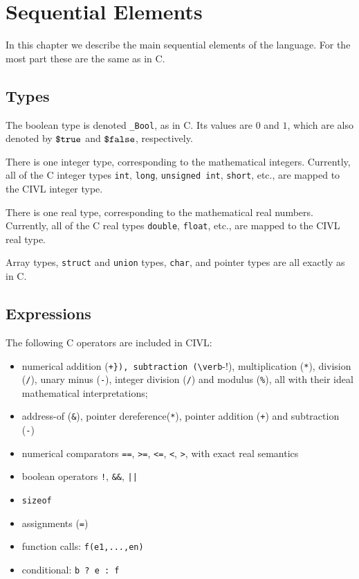
\chapter{Sequential Elements}

In this chapter we describe the main sequential elements of the
language.  For the most part these are the same as in C.

\section{Types}

The boolean type is denoted \verb!_Bool!, as in C. Its values are $0$
and $1$, which are also denoted by $\mbox{\texttt{\${}true}}$ and $\mbox{\texttt{\${}false}}$,
respectively.

There is one integer type, corresponding to the mathematical integers.
Currently, all of the C integer types \texttt{int}, \texttt{long},
\texttt{unsigned\ int}, \texttt{short}, etc., are mapped to the CIVL
integer type.

There is one real type, corresponding to the mathematical real
numbers. Currently, all of the C real types \texttt{double},
\texttt{float}, etc., are mapped to the CIVL real type.

Array types, \texttt{struct} and \texttt{union} types, \texttt{char},
and pointer types are all exactly as in C.


\section{Expressions}

The following C operators are included in CIVL: 
\begin{itemize}
\item numerical addition (\verb!+}), subtraction (\verb!-!), multiplication
  (\verb!*!), division (\verb!/!), unary minus (\verb!-!),
  integer division (\verb!/!) and modulus (\verb!%!), all with
  their ideal mathematical interpretations;
\item address-of (\verb!&!), pointer dereference(\verb!*!),
  pointer addition (\verb!+!) and subtraction (\verb!-!)
\item numerical comparators \verb!==!, \verb!>=!, \verb!<=!, \verb!<!, \verb!>!,
  with exact real semantics
\item boolean operators \verb~!~, \verb!&&!, \verb!||!
\item \verb!sizeof!
\item assignments (\verb!=!)
\item function calls: \verb!f(e1,...,en)!
\item conditional: \verb!b ? e : f!
\end{itemize}

